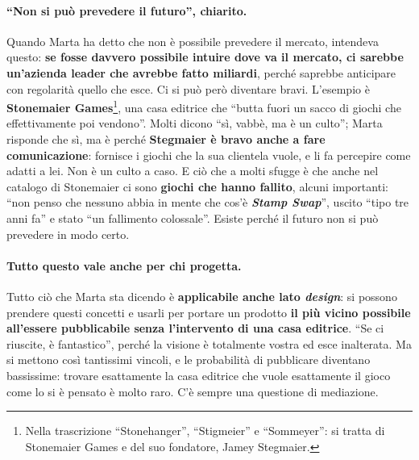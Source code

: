 \paragraph{``Non si può prevedere il futuro'', chiarito.} Quando Marta ha detto che non è
possibile prevedere il mercato, intendeva questo: \textbf{se fosse davvero possibile
intuire dove va il mercato, ci sarebbe un'azienda leader che avrebbe fatto miliardi},
perché saprebbe anticipare con regolarità quello che esce. Ci si può però diventare bravi.
L'esempio è \textbf{Stonemaier Games}\footnote{Nella trascrizione ``Stonehanger'',
``Stigmeier'' e ``Sommeyer'': si tratta di Stonemaier Games e del suo fondatore, Jamey
Stegmaier.}, una casa editrice che ``butta fuori un sacco di giochi che effettivamente poi
vendono''. Molti dicono ``sì, vabbè, ma è un culto''; Marta risponde che sì, ma è perché
\textbf{Stegmaier è bravo anche a fare comunicazione}: fornisce i giochi che la sua
clientela vuole, e li fa percepire come adatti a lei. Non è un culto a caso. E ciò che a
molti sfugge è che anche nel catalogo di Stonemaier ci sono \textbf{giochi che hanno
fallito}, alcuni importanti: ``non penso che nessuno abbia in mente che cos'è
\textbf{\emph{Stamp Swap}}'', uscito ``tipo tre anni fa'' e stato ``un fallimento
colossale''. Esiste perché il futuro non si può prevedere in modo certo.

\paragraph{Tutto questo vale anche per chi progetta.} Tutto ciò che Marta sta dicendo è
\textbf{applicabile anche lato \emph{design}}: si possono prendere questi concetti e usarli
per portare un prodotto \textbf{il più vicino possibile all'essere pubblicabile senza
l'intervento di una casa editrice}. ``Se ci riuscite, è fantastico'', perché la visione è
totalmente vostra ed esce inalterata. Ma si mettono così tantissimi vincoli, e le
probabilità di pubblicare diventano bassissime: trovare esattamente la casa editrice che
vuole esattamente il gioco come lo si è pensato è molto raro. C'è sempre una questione di
mediazione.

